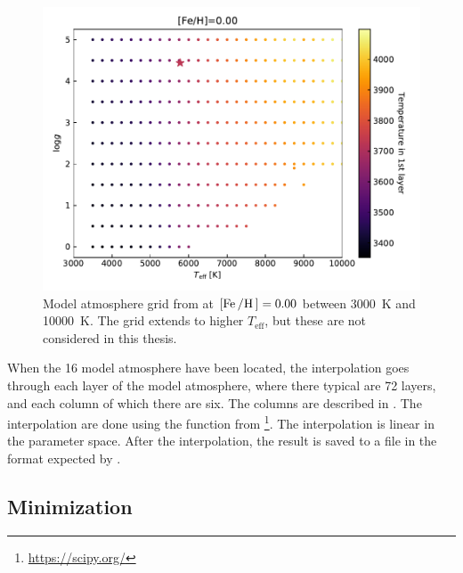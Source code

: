 \begin{figure}[htpb!]
    \centering
    \includegraphics[width=0.85\linewidth]{figures/model_atmosphere.pdf}
    \caption{Model atmosphere grid from \citet{Kurucz1993} at
             $[\ion{Fe}/\ion{H}]=0.00$ between \SI{3000}{K} and \SI{10000}{K}.
             The grid extends to higher $T_\mathrm{eff}$, but these are not
             considered in this thesis.}
    \label{fig:grid}
\end{figure}

When the 16 model atmosphere have been located, the interpolation goes through
each layer of the model atmosphere, where there typical are 72 layers, and each
column of which there are six. The columns are described in
. The interpolation are done using the
 function from \footnote{\url{https://scipy.org/}}.
The interpolation is linear in the parameter space. After the interpolation, the
result is saved to a file in the format expected by \MOOG.






\subsection{Minimization}

